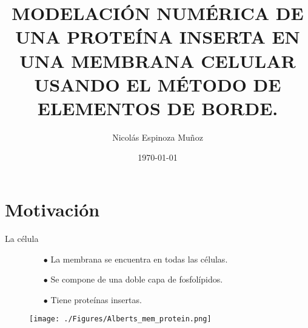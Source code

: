 \documentclass[serif,usenames,dvipsnames,landscape]{beamer}
\author{Nicolás Espinoza Muñoz}
\title{MODELACIÓN NUMÉRICA DE UNA PROTEÍNA INSERTA EN UNA MEMBRANA CELULAR USANDO EL MÉTODO DE ELEMENTOS DE BORDE.}
\institute{UNIVERSIDAD TÉCNICA FEDERICO SANTA MARÍA}
\date{\today}
\begin{document}
	\maketitle
	\section{Motivación}
	
\begin{frame}{La célula}
	\begin{figure}
		\begin{minipage}{0.5\slidewidth}
			\begin{itemize}
				\item[$\bullet$] La membrana se encuentra en todas las células.
				\item[$\bullet$] Se compone de una doble capa de fosfolípidos.
				\item[$\bullet$] Tiene proteínas insertas.
			\end{itemize}
		\end{minipage}
	\vspace{15pt}
		\begin{minipage}{0.1\slidewidth}
			\hspace*{0.5cm}
		\end{minipage}%
		\begin{minipage}{0.2\slidewidth}
			\texttt{[image: ./Figures/Alberts\_mem\_protein.png]}
		\end{minipage}
	\vspace{-50pt}
		\begin{minipage}{0.45\slidewidth}
			
		\end{minipage}
	\end{figure}
\end{frame}
\end{document}
